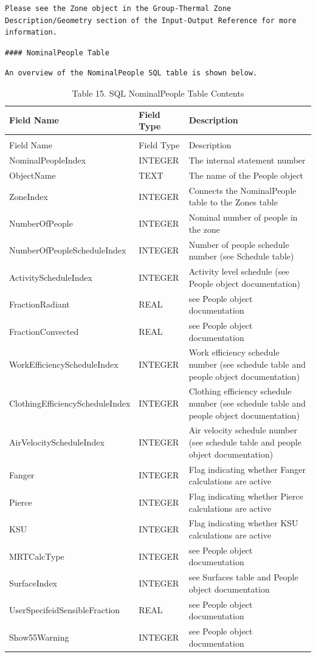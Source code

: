\begin{lstlisting}
Please see the Zone object in the Group-Thermal Zone Description/Geometry section of the Input-Output Reference for more information.
\end{lstlisting}

\begin{lstlisting}
#### NominalPeople Table
\end{lstlisting}

\begin{lstlisting}
An overview of the NominalPeople SQL table is shown below.
\end{lstlisting}

\begin{longtable}[c]{p{1.5in}p{1.5in}p{3.0in}}
\caption{Table 15. SQL NominalPeople Table Contents \label{table:table-15.-sql-nominalpeople-table-contents}} \tabularnewline
\toprule 
Field Name & Field Type & Description \tabularnewline
\midrule
\endfirsthead

\caption[]{Table 15. SQL NominalPeople Table Contents} \tabularnewline
\toprule 
Field Name & Field Type & Description \tabularnewline
\midrule
\endhead

NominalPeopleIndex & INTEGER & The internal statement number \tabularnewline
ObjectName & TEXT & The name of the People object \tabularnewline
ZoneIndex & INTEGER & Connects the NominalPeople table to the Zones table \tabularnewline
NumberOfPeople & INTEGER & Nominal number of people in the zone \tabularnewline
NumberOfPeopleScheduleIndex & INTEGER & Number of people schedule number (see Schedule table) \tabularnewline
ActivityScheduleIndex & INTEGER & Activity level schedule (see People object documentation) \tabularnewline
FractionRadiant & REAL & see People object documentation \tabularnewline
FractionConvected & REAL & see People object documentation \tabularnewline
WorkEfficiencyScheduleIndex & INTEGER & Work efficiency schedule number (see schedule table and people object documentation) \tabularnewline
ClothingEfficiencyScheduleIndex & INTEGER & Clothing efficiency schedule number (see schedule table and people object documentation) \tabularnewline
AirVelocityScheduleIndex & INTEGER & Air velocity schedule number (see schedule table and people object documentation) \tabularnewline
Fanger & INTEGER & Flag indicating whether Fanger calculations are active \tabularnewline
Pierce & INTEGER & Flag indicating whether Pierce calculations are active \tabularnewline
KSU & INTEGER & Flag indicating whether KSU calculations are active \tabularnewline
MRTCalcType & INTEGER & see People object documentation \tabularnewline
SurfaceIndex & INTEGER & see Surfaces table and People object documentation \tabularnewline
UserSpecifeidSensibleFraction & REAL & see People object documentation \tabularnewline
Show55Warning & INTEGER & see People object documentation \tabularnewline
\bottomrule
\end{longtable}

